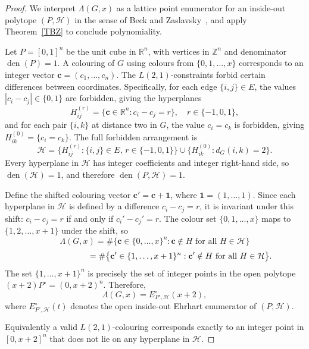 \documentclass{birkjour}
\theoremstyle{definition}
\theoremstyle{remark}
\numberwithin{equation}{section}
\begin{document}
\begin{proof}
We interpret \( \Lambda(G, x) \) as a lattice point enumerator for an inside-out
polytope \( (P, \mathcal{H}) \) in the sense of Beck and Zaslavsky~\cite{BZ},
and apply Theorem~\ref{TBZ} to conclude polynomiality.
 
Let \( P = [0,1]^n \) be the unit cube in \( \mathbb{R}^n \), with vertices in
\( \mathbb{Z}^n \) and denominator \( \operatorname{den}(P) = 1 \).
A colouring of \( G \) using colours from \( \{0, 1, \dots, x\} \) corresponds
to an integer vector \( \mathbf{c} = (c_1, \dots, c_n) \).
The \( L(2,1) \)-constraints forbid certain differences between coordinates.
Specifically, for each edge \( \{i,j\} \in E \), the values \( |c_i - c_j| \in \{0,1\} \)
are forbidden, giving the hyperplanes
\[
H_{ij}^{(r)} = \bigl\{\mathbf{c} \in \mathbb{R}^n : c_i - c_j = r\bigr\},
\quad r \in \{-1, 0, 1\},
\]
and for each pair \( \{i,k\} \) at distance two in \( G \), the value \( c_i = c_k \)
is forbidden, giving \( H_{ik}^{(0)} = \{c_i = c_k\} \).
The full forbidden arrangement is
\[
\mathcal{H} = \bigl\{H_{ij}^{(r)} : \{i,j\} \in E,\, r \in \{-1,0,1\}\bigr\}
\cup \bigl\{H_{ik}^{(0)} : d_G(i,k) = 2\bigr\}.
\]
Every hyperplane in \( \mathcal{H} \) has integer coefficients and integer
right-hand side, so \( \operatorname{den}(\mathcal{H}) = 1 \), and therefore
\( \operatorname{den}(P,\mathcal{H}) = 1 \).
 
Define the shifted colouring vector \( \mathbf{c}' = \mathbf{c} + \mathbf{1} \),
where \( \mathbf{1} = (1,\dots,1) \). Since each hyperplane in \( \mathcal{H} \)
is defined by a difference \( c_i - c_j = r \), it is invariant under
this shift: \( c_i - c_j = r \) if and only if \( c_i' - c_j' = r \).
The colour set \( \{0, 1, \dots, x\} \) maps to \( \{1, 2, \dots, x+1\} \)
under the shift, so
$$
\Lambda(G, x)
= \#\bigl\{\mathbf{c} \in \{0,\dots,x\}^n : \mathbf{c} \notin H
   \text{ for all } H \in \mathcal{H}\bigr\}$$
$$\hskip 2.2cm = \#\bigl\{\mathbf{c}' \in \{1,\dots,x+1\}^n : \mathbf{c}' \notin H
   \text{ for all } H \in \mathcal{H}\bigr\}.
$$
The set \( \{1, \dots, x+1\}^n \) is precisely the set of integer points
in the open polytope \( (x+2)P^{\circ} = (0, x+2)^n \). Therefore,
\[
\Lambda(G, x) = E^{\circ}_{P^{\circ},\mathcal{H}}(x+2),
\]
where \( E^{\circ}_{P^{\circ},\mathcal{H}}(t) \) denotes the open inside-out
Ehrhart enumerator of \( (P, \mathcal{H}) \).

Equivalently a valid \( L(2,1) \)-colouring corresponds exactly to an integer point in 
\( [0,x+2]^n \) that does not lie on any hyperplane in \( \mathcal{H} \).


\end{proof}
\end{document}
